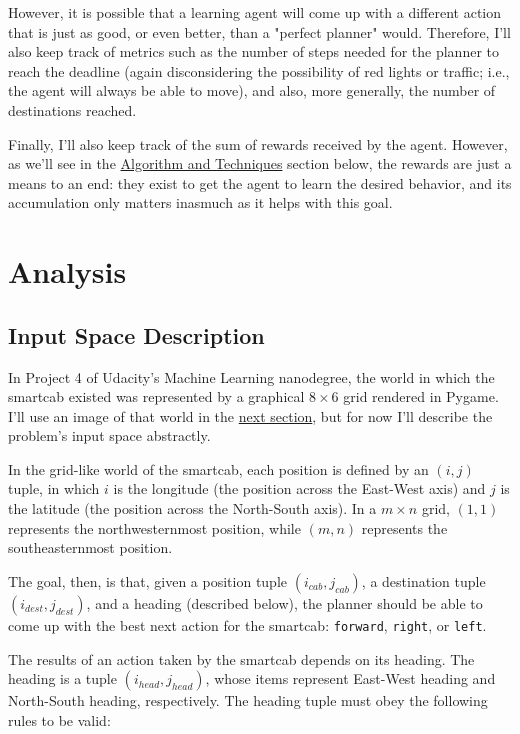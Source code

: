 \documentclass{article}
\begin{document}
However, it is possible that a learning agent will come up with a different action that is just as good, or even better, than a "perfect planner" would. Therefore, I'll also keep track of metrics such as the number of steps needed for the planner to reach the deadline (again disconsidering the possibility of red lights or traffic; i.e., the agent will always be able to move), and also, more generally, the number of destinations reached.

Finally, I'll also keep track of the sum of rewards received by the agent. However, as we'll see in the \hyperref[sec:algos]{Algorithm and Techniques} section below, the rewards are just a means to an end: they exist to get the agent to learn the desired behavior, and its accumulation only matters inasmuch as it helps with this goal.


\section{Analysis}

\subsection{Input Space Description}

In Project 4 of Udacity's Machine Learning nanodegree, the world in which the smartcab existed was represented by a graphical $8\times6$ grid rendered in Pygame. I'll use an image of that world in the \hyperref[sec:explovis]{next section}, but for now I'll describe the problem's input space abstractly.

In the grid-like world of the smartcab, each position is defined by an $(i, j)$ tuple, in which $i$ is the longitude (the position across the East-West axis) and $j$ is the latitude (the position across the North-South axis). In a $m\times n$ grid, $(1, 1)$ represents the northwesternmost position, while $(m, n)$ represents the southeasternmost position.

The goal, then, is that, given a position tuple $(i_{cab}, j_{cab})$, a destination tuple $(i_{dest}, j_{dest})$, and a heading (described below), the planner should be able to come up with the best next action for the smartcab: \texttt{forward}, \texttt{right}, or \texttt{left}. 

The results of an action taken by the smartcab depends on its heading. The heading is a tuple $(i_{head}, j_{head})$, whose items represent East-West heading and North-South heading, respectively. The heading tuple must obey the following rules to be valid:
\end{document}
